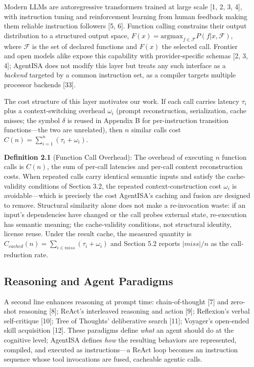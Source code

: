 \documentclass[
  sigconf,
  anonymous]{acmart}
\begin{document}
Modern LLMs are autoregressive transformers trained at large scale {[}1,
2, 3, 4{]}, with instruction tuning and reinforcement learning from
human feedback making them reliable instruction followers {[}5, 6{]}.
Function calling constrains their output distribution to a structured
output space,
\(F(x) = \text{argmax}_{f \in \mathcal{F}} P(f|x, \mathcal{F})\), where
\(\mathcal{F}\) is the set of declared functions and \(F(x)\) the
selected call. Frontier and open models alike expose this capability
with provider-specific schemas {[}2, 3, 4{]}; AgentISA does not modify
this layer but treats any such interface as a \emph{backend} targeted by
a common instruction set, as a compiler targets multiple processor
backends {[}33{]}.

The cost structure of this layer motivates our work. If each call
carries latency \(\tau_i\) plus a context-switching overhead
\(\omega_i\) (prompt reconstruction, serialization, cache misses; the
symbol \(\delta\) is reused in Appendix B for per-instruction transition
functions---the two are unrelated), then \(n\) similar calls cost
\(C(n) = \sum_{i=1}^{n} (\tau_i + \omega_i)\).

\textbf{Definition 2.1} (Function Call Overhead): The overhead of
executing \(n\) function calls is \(C(n)\), the sum of per-call
latencies and per-call context reconstruction costs. When repeated calls
carry identical semantic inputs and satisfy the cache-validity
conditions of Section 3.2, the repeated context-construction cost
\(\omega_i\) is avoidable---which is precisely the cost AgentISA's
caching and fusion are designed to remove. Structural similarity alone
does not make a re-invocation waste: if an input's dependencies have
changed or the call probes external state, re-execution has semantic
meaning; the cache-validity conditions, not structural identity, license
reuse. Under the result cache, the measured quantity is
\(C_{cached}(n) = \sum_{i \in miss}(\tau_i + \omega_i)\) and Section 5.2
reports \(|miss|/n\) as the call-reduction rate.

\subsection{Reasoning and Agent
Paradigms}\label{reasoning-and-agent-paradigms}

A second line enhances reasoning at prompt time: chain-of-thought
{[}7{]} and zero-shot reasoning {[}8{]}; ReAct's interleaved reasoning
and action {[}9{]}; Reflexion's verbal self-critique {[}10{]}; Tree of
Thoughts' deliberative search {[}11{]}; Voyager's open-ended skill
acquisition {[}12{]}. These paradigms define \emph{what} an agent should
do at the cognitive level; AgentISA defines \emph{how} the resulting
behaviors are represented, compiled, and executed as instructions---a
ReAct loop becomes an instruction sequence whose tool invocations are
fused, cacheable agentic calls.
\end{document}
